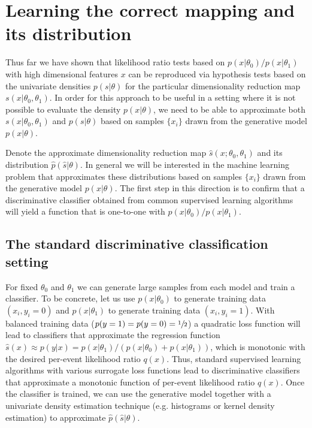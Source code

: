 \documentclass[aoas,preprint]{imsart}
\numberwithin{equation}{section}
\theoremstyle{plain}
\begin{document}
\section{Learning the correct mapping and its distribution}\label{S:classifier}

Thus far we have shown that likelihood ratio tests based on $p(x|\theta_0)/p(x|\theta_1)$ with high dimensional features $x$ can be reproduced via hypothesis tests based on the univariate densities $p(s|\theta)$ for the particular dimensionality reduction map $s(x|\theta_0, \theta_1)$.
In order for this approach to be useful in a setting where it is not possible to evaluate the density $p(x|\theta)$, we need to be able to approximate both $s(x|\theta_0, \theta_1)$ and $p(s|\theta)$ based on samples $\{x_i\}$ drawn from the generative model $p(x|\theta)$.  

Denote the approximate dimensionality reduction map $\hat{s}(x; \theta_0, \theta_1)$ and its distribution $\hat{p}(\hat{s}|\theta)$. In general we will be interested in the machine learning problem that approximates these distributions based on samples $\{x_i\}$ drawn from the generative model $p(x|\theta)$.  
The first step in this direction is to confirm that a discriminative classifier obtained from common supervised learning algorithms will yield a function that is one-to-one with $p(x|\theta_0)/p(x|\theta_1)$.


\subsection{The standard discriminative classification setting} 
For fixed $\theta_0$ and $\theta_1$ we can generate 
large samples from each model and train a classifier. To be concrete, let us use $p(x|\theta_0)$ to generate training 
data $(x_i,  y_i=0)$ and $p(x|\theta_1)$ to generate training data $(x_i , y_i=1)$. With balanced training data   ($p(y=1)=p(y=0)=\sfrac{1}{2}$) a quadratic loss function will lead to classifiers that approximate the regression function  $\hat{s}(x) \approx p(y|x) = p(x|\theta_1)/(p(x|\theta_0)+p(x|\theta_1))$, which is  monotonic with the desired per-event likelihood ratio $q(x)$. Thus, standard supervised learning algorithms with various surrogate loss functions lead to discriminative classifiers that approximate a monotonic function of per-event likelihood ratio $q(x)$.  Once the classifier is trained, we can use the generative model together with a univariate density estimation technique (e.g. histograms or kernel density estimation) to approximate $\hat{p}(\hat{s}|\theta)$.
\end{document}
